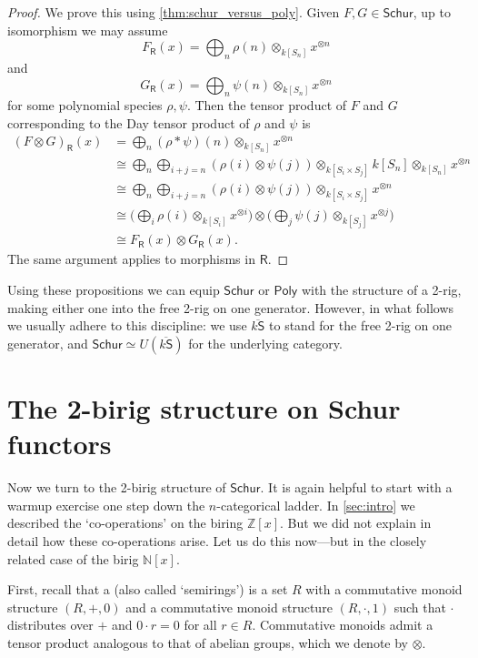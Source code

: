 \documentclass[12pt,reqno]{amsart}
\theoremstyle{plain}
\theoremstyle{definition}
\theoremstyle{remark}
\newcommand{\define}[1]{{\bf \boldmath{#1}}\index{#1}}
\newcommand{\category}[1]{\mathsf{#1}}
\newcommand{\N}{\mathbb N}
\newcommand{\R}{\category R}
\renewcommand{\S}{\category S}
\newcommand{\Z}{\mathbb Z}
\newcommand{\namedcat}[1]{\mathsf{#1}}
\newcommand{\Poly}{\namedcat{Poly}}
\newcommand{\Schur}{\namedcat{Schur}}
\newcommand{\ksbar}{\overline{k\S}}
\numberwithin{thm}{section}
\begin{document}
\begin{proof}  
    We prove this using \cref{thm:schur_versus_poly}. Given $F, G \in \Schur$, up to isomorphism we may assume 
    \[    
        F_\R(x) = \bigoplus_n \rho(n) \otimes_{k[S_n]} x^{\otimes n} 
    \]
    and
    \[   
        G_\R(x) = \bigoplus_n \psi(n) \otimes_{k[S_n]} x^{\otimes n} 
    \]
    for some polynomial species $\rho, \psi$. Then the tensor product of $F$ and $G$ corresponding to the Day tensor product of $\rho$ and $\psi$ is
    \begin{align*}
        (F \otimes G)_\R(x)
        &= \bigoplus_n (\rho \ast \psi)(n) \otimes_{k[S_n]} x^{\otimes n} 
        \\&\cong \bigoplus_n \bigoplus_{i+j = n} (\rho(i) \otimes \psi(j)) \otimes_{k[S_i \times S_j]} k[S_n] \otimes_{k[S_n]} x^{\otimes n} 
        \\&\cong \bigoplus_n \bigoplus_{i+j = n} (\rho(i) \otimes \psi(j)) \otimes_{k[S_i \times S_j]} x^{\otimes n} 
        \\&\cong \big( \bigoplus_i \rho(i)  \otimes_{k[S_i]} x^{\otimes i} \big)
        \otimes \big( \bigoplus_j \psi(j)  \otimes_{k[S_j]} x^{\otimes j} \big) 
        \\&\cong F_\R(x) \otimes G_\R(x) .
    \end{align*}
    The same argument applies to morphisms in $\R$.  
\end{proof}

Using these propositions we can equip $\Schur$ or $\Poly$ with the structure of a 2-rig, making either one into the free 2-rig on one generator. However, in what follows we usually adhere to this discipline: we use $\ksbar$ to stand for the free 2-rig on one generator, and $\Schur \simeq U(\ksbar)$ for the underlying category.

\section{The 2-birig structure on Schur functors}
\label{sec:2-birig}

Now we turn to the 2-birig structure of $\Schur$. It is again helpful to start with a warmup exercise one step down the $n$-categorical ladder. In \cref{sec:intro} we described the `co-operations' on the biring $\Z[x]$. But we did not explain in detail how these co-operations arise. Let us do this now---but in the closely related case of the birig $\N[x]$.

First, recall that a \define{rig} (also called `semirings') is a set $R$ with a commutative monoid structure $(R, +, 0)$ and a commutative monoid structure $(R, \cdot, 1)$ such that $\cdot$ distributes over $+$ and $0 \cdot r = 0$ for all $r \in R$. Commutative monoids admit a tensor product analogous to that of abelian groups, which we denote by $\otimes$.
\end{document}
